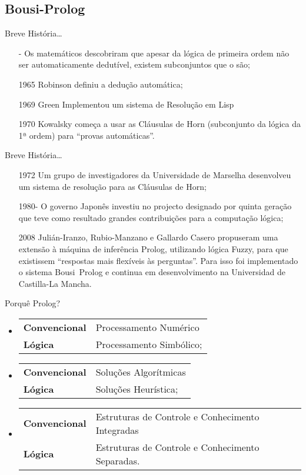 \documentclass[portuges]{beamer}
\begin{document}
\subsection{Bousi-Prolog}

\begin{frame}{Breve História\ldots}
\begin{itemize}[<+->]
	\item[-] Os matemáticos descobriram que apesar da lógica 
	de primeira ordem não ser automaticamente dedutível,
	existem subconjuntos que o são;
	\item[1965] Robinson definiu a dedução automática;
	\item[1969] Green Implementou um sistema de Resolução em Lisp
	\item[1970] Kowalsky começa a usar as Cláusulas de Horn (subconjunto
	da lógica da 1ª ordem) para ``provas automáticas''.
	
\end{itemize}
\end{frame}

\begin{frame}{Breve História\ldots}
	\begin{itemize}[<+->]
		\item[1972] Um grupo de investigadores da Universidade de Marselha desenvolveu 
		um sistema de resolução para as Cláusulas de Horn;
		\item[1980-] O governo Japonês investiu no projecto designado por quinta geração que
		teve como resultado grandes contribuições para a computação lógica;
		\item[2008] Julián-Iranzo, Rubio-Manzano e Gallardo Casero 
	propuseram uma extensão à máquina de inferência Prolog,
	utilizando lógica Fuzzy, para que existissem ``respostas
	mais flexíveis às perguntas''. Para isso foi implementado
	o sistema Bousi~Prolog e continua em desenvolvimento na
	Universidad de Castilla-La Mancha.	
	\end{itemize}
\end{frame}

\begin{frame}{Porquê Prolog?}
\begin{itemize}[<+->]
\item 
	\begin{tabular}{p{3cm}p{5cm}}
{\textbf{Convencional}} & Processamento Numérico \\
{\textbf{Lógica}}  & Processamento Simbólico;
	\end{tabular}
\item 
	\begin{tabular}{p{3cm}p{5cm}}
{\textbf{Convencional}} & Soluções Algorítmicas \\
{\textbf{Lógica}}  & Soluções Heurística;
	\end{tabular}
\item 
	\begin{tabular}{p{3cm}p{5cm}}
{\textbf{Convencional}} & Estruturas de Controle e Conhecimento Integradas  \\
{\textbf{Lógica}}  &  Estruturas de Controle e Conhecimento Separadas.  
	\end{tabular}
\end{itemize}
\end{frame}
\end{document}
